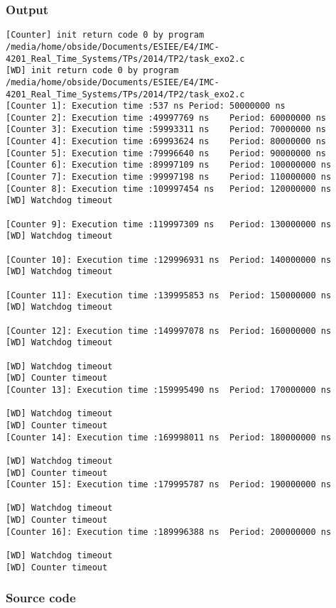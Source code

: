 \subsubsection{Output}
\begin{lstlisting}[keywordstyle=\color{black}]
[Counter] init return code 0 by program /media/home/obside/Documents/ESIEE/E4/IMC-4201_Real_Time_Systems/TPs/2014/TP2/task_exo2.c
[WD] init return code 0 by program /media/home/obside/Documents/ESIEE/E4/IMC-4201_Real_Time_Systems/TPs/2014/TP2/task_exo2.c
[Counter 1]: Execution time :537 ns	Period: 50000000 ns
[Counter 2]: Execution time :49997769 ns	Period: 60000000 ns
[Counter 3]: Execution time :59993311 ns	Period: 70000000 ns
[Counter 4]: Execution time :69993624 ns	Period: 80000000 ns
[Counter 5]: Execution time :79996640 ns	Period: 90000000 ns
[Counter 6]: Execution time :89997109 ns	Period: 100000000 ns
[Counter 7]: Execution time :99997198 ns	Period: 110000000 ns
[Counter 8]: Execution time :109997454 ns	Period: 120000000 ns
[WD] Watchdog timeout

[Counter 9]: Execution time :119997309 ns	Period: 130000000 ns
[WD] Watchdog timeout

[Counter 10]: Execution time :129996931 ns	Period: 140000000 ns
[WD] Watchdog timeout

[Counter 11]: Execution time :139995853 ns	Period: 150000000 ns
[WD] Watchdog timeout

[Counter 12]: Execution time :149997078 ns	Period: 160000000 ns
[WD] Watchdog timeout

[WD] Watchdog timeout
[WD] Counter timeout
[Counter 13]: Execution time :159995490 ns	Period: 170000000 ns

[WD] Watchdog timeout
[WD] Counter timeout
[Counter 14]: Execution time :169998011 ns	Period: 180000000 ns

[WD] Watchdog timeout
[WD] Counter timeout
[Counter 15]: Execution time :179995787 ns	Period: 190000000 ns

[WD] Watchdog timeout
[WD] Counter timeout
[Counter 16]: Execution time :189996388 ns	Period: 200000000 ns

[WD] Watchdog timeout
[WD] Counter timeout
\end{lstlisting}

\subsubsection{Source code}

